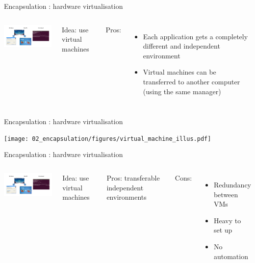 \begin{frame}{Encapsulation : hardware virtualisation}
\begin{columns}

\includegraphics[width=6cm]{02_encapsulation/figures/install_firefox.pdf}

Idea: use virtual machines

Pros: 
\begin{itemize}
  \item Each application gets a completely different and independent environment
  \item Virtual machines can be transferred to another computer (using the same manager)
\end{itemize}

\end{columns}
\end{frame}

\begin{frame}{Encapsulation : hardware virtualisation}

\texttt{[image: 02\_encapsulation/figures/virtual\_machine\_illus.pdf]}

\end{frame}

\begin{frame}{Encapsulation : hardware virtualisation}
\begin{columns}

\includegraphics[width=6cm]{02_encapsulation/figures/install_firefox.pdf}

Idea: use virtual machines

Pros:  transferable independent environments

Cons:
\begin{itemize}
  \item Redundancy between VMs
  \item Heavy to set up
  \item No automation
\end{itemize}

\end{columns}
\end{frame}

